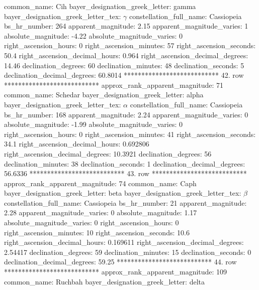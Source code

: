                        common_name: Cih
    bayer_designation_greek_letter: gamma
bayer_designation_greek_letter_tex: $\gamma$
           constellation_full_name: Cassiopeia
                      bs_hr_number: 264
                apparent_magnitude: 2.15
         apparent_magnitude_varies: 1
                absolute_magnitude: -4.22
         absolute_magnitude_varies: 0
             right_ascension_hours: 0
           right_ascension_minutes: 57
           right_ascension_seconds: 50.4
     right_ascension_decimal_hours: 0.964
   right_ascension_decimal_degrees: 14.46
               declination_degrees: 60
               declination_minutes: 48
               declination_seconds: 5
       declination_decimal_degrees: 60.8014
*************************** 42. row ***************************
    approx_rank_apparent_magnitude: 71
                       common_name: Schedar
    bayer_designation_greek_letter: alpha
bayer_designation_greek_letter_tex: $\alpha$
           constellation_full_name: Cassiopeia
                      bs_hr_number: 168
                apparent_magnitude: 2.24
         apparent_magnitude_varies: 0
                absolute_magnitude: -1.99
         absolute_magnitude_varies: 0
             right_ascension_hours: 0
           right_ascension_minutes: 41
           right_ascension_seconds: 34.1
     right_ascension_decimal_hours: 0.692806
   right_ascension_decimal_degrees: 10.3921
               declination_degrees: 56
               declination_minutes: 38
               declination_seconds: 1
       declination_decimal_degrees: 56.6336
*************************** 43. row ***************************
    approx_rank_apparent_magnitude: 74
                       common_name: Caph
    bayer_designation_greek_letter: beta
bayer_designation_greek_letter_tex: $\beta$
           constellation_full_name: Cassiopeia
                      bs_hr_number: 21
                apparent_magnitude: 2.28
         apparent_magnitude_varies: 0
                absolute_magnitude: 1.17
         absolute_magnitude_varies: 0
             right_ascension_hours: 0
           right_ascension_minutes: 10
           right_ascension_seconds: 10.6
     right_ascension_decimal_hours: 0.169611
   right_ascension_decimal_degrees: 2.54417
               declination_degrees: 59
               declination_minutes: 15
               declination_seconds: 0
       declination_decimal_degrees: 59.25
*************************** 44. row ***************************
    approx_rank_apparent_magnitude: 109
                       common_name: Ruchbah
    bayer_designation_greek_letter: delta
